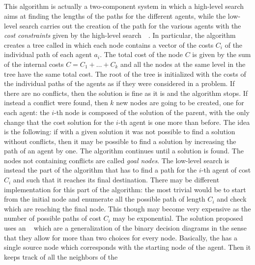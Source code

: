 \subsection{}
This algorithm is actually a two-component system in which a high-level search
aims at finding the lengths of the paths for the different agents, while the 
low-level search carries out the creation of the path for the various
agents with the \textit{cost constraints} given by the high-level 
search~\cite{MAPF_overview}~\cite{ICTS}. \newline
In particular, the algorithm creates a tree called  in which each 
node contains a vector of the costs $C_i$ of the individual path of each agent
$a_i$. The total cost of the node $C$ is given by the sum of the internal costs
$C=C_1+\hdots+C_k$ and all the nodes at the same level in the tree have the
same total cost. \newline
The root of the tree is initialized with the costs of the individual paths of
the agents as if they were considered in a  problem. If there are no
conflicts, then the solution is fine as it is and the algorithm stops. If 
instead a conflict were found, then $k$ new nodes are going to be created, one 
for each agent: the $i$-th node is composed of the solution of the parent, with
the only change that the cost solution for the $i$-th agent is one more than
before. The idea is the following: if with a given solution it was not possible
to find a solution without conflicts, then it may be possible to find a
solution by increasing the path of an agent by one. The algorithm continues 
until a solution is found. The  nodes not containing conflicts are 
called \textit{goal nodes}. \newline
The low-level search is instead the part of the algorithm that has to find a
path for the $i$-th agent of cost $C_i$ and such that it reaches its final
destination. There may be different implementation for this part of the
algorithm: the most trivial would be to start from the initial node and
enumerate all the possible path of length $C_i$ and check which are reaching
the final node. This though may become very expensive as the number of possible
paths of cost $C_i$ may be exponential. The solution proposed~\cite{ICTS} uses
an ~\cite{MDD} which are a generalization of the binary decision
diagrams in the sense that they allow for more than two choices for every node.
Basically, the  has a single source node which corresponds with the
starting node of the agent. Then it keeps track of all the neighbors of the
